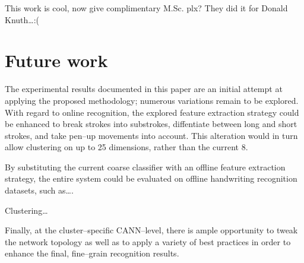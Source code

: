 \documentclass[10pt,conference,a4paper]{IEEEtran}
\begin{document}
	This work is cool, now give complimentary M.Sc. plx?
	They did it for Donald Knuth\ldots :(


	\section{Future work}

	The experimental results documented in this paper are an initial attempt at applying the proposed methodology;
	numerous variations remain to be explored. With regard to online recognition, the explored feature extraction
	strategy could be enhanced to break strokes into substrokes, diffentiate between long and short strokes, and take
	pen--up movements into account. This alteration would in turn allow clustering on up to 25 dimensions, rather than the current 8.

	By substituting the current coarse classifier with an offline feature extraction strategy, the entire system could
	be evaluated on offline handwriting recognition datasets, such as\ldots. 

	Clustering\ldots

	Finally, at the cluster--specific CANN--level, there is ample opportunity to tweak the network topology as well as
	to apply a variety of best practices \cite{simard2003best} in order to enhance the final, fine--grain recognition results.



	
\end{document}
